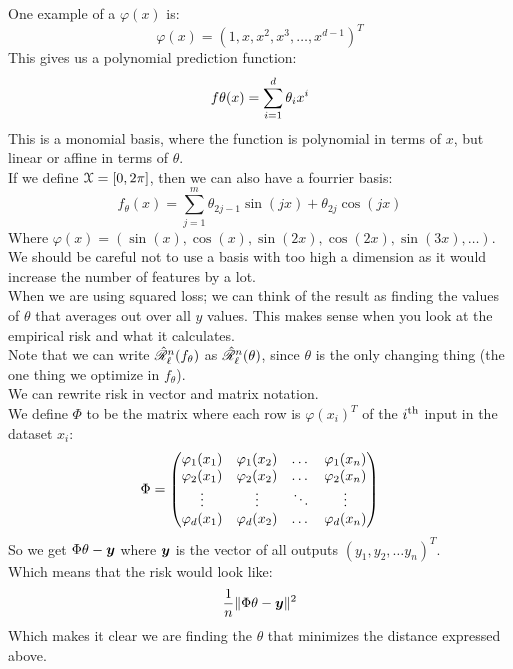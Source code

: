 \documentclass[12pt]{article}
\begin{document}
One example of a $\varphi(x)$ is:
\[ \varphi(x) = (1, x, x^2, x^3, \dots, x^{d-1})^T \]
This gives us a polynomial prediction function:
\[ f\theta(x) = \sum_{i=1}^{d}\theta_i x^i \]
This is a monomial basis, where the function
is polynomial in terms of $x$,
but linear or affine in terms of $\theta$. \\

If we define $\mathcal{X} = [0, 2\pi]$,
then we can also have a fourrier basis:
\[ f_\theta(x)
= \sum_{j = 1}^{m} \theta_{2j-1}\sin(jx) 
+ \theta_{2j}\cos(jx) \]
Where $\varphi(x) = (\sin(x), \cos(x),
\sin(2x), \cos(2x), \sin(3x), \dots)$. \\

We should be careful not to use a basis with too
high a dimension as it would increase the number
of features by a lot. \\

When we are using squared loss; we can think
of the result as finding the values of $\theta$
that averages out over all $y$ values.
This makes sense when you look at the
empirical risk and what it calculates. \\

Note that we can write $\hat{\mathscr{R}}_{\ell}^{n}
(f_\theta)$ as $\hat{\mathscr{R}}_{\ell}^{n}
(\theta)$,
since $\theta$ is the only changing thing
(the one thing we optimize in $f_\theta$). \\

We can rewrite risk in vector and matrix
notation. \\
We define $\Phi$ to be the matrix
where each row is $\varphi(x_i)^T$
of the $i^{\text{th}}$ input in the dataset $x_i$:
\[ \Phi = \begin{pmatrix} 
\varphi_1(x_1) & \varphi_1(x_2) & \dots & \varphi_1(x_n) \\
\varphi_2(x_1) & \varphi_2(x_2) & \dots & \varphi_2(x_n) \\
\vdots & \vdots & \ddots & \vdots \\
\varphi_d(x_1) & \varphi_d(x_2) & \dots & \varphi_d(x_n) \end{pmatrix} \]
So we get $\Phi \theta - \boldsymbol{y}$
where $\boldsymbol{y}$ is the vector of all
outputs $(y_1, y_2, \dots y_n)^T$. \\
Which means that the risk would look like:
\[ \dfrac{1}{n}\|\Phi \theta - \boldsymbol{y}\|^2 \]
Which makes it clear we are finding the $\theta$
that minimizes the distance expressed above. \\
\end{document}
